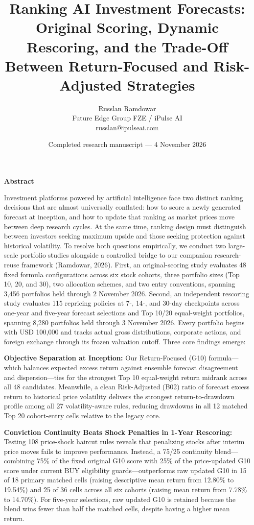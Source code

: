 \documentclass[11pt,a4paper]{article}
\title{Ranking AI Investment Forecasts: Original Scoring, Dynamic Rescoring, and the Trade-Off Between Return-Focused and Risk-Adjusted Strategies}
\author{Russlan Ramdowar\\Future Edge Group FZE / iPulse AI\\\href{mailto:russlan@ipulseai.com}{russlan@ipulseai.com}}
\date{Completed research manuscript --- 4 November 2026}
\numberwithin{table}{section}
\renewenvironment{abstract}{\small\noindent\textbf{Abstract}\par\medskip}{\par}
\begin{document}
\maketitle
\vspace{-1.1em}
\begin{abstract}

Investment platforms powered by artificial intelligence face two distinct ranking decisions that are almost universally conflated: how to score a newly generated forecast at inception, and how to update that ranking as market prices move between deep research cycles. At the same time, ranking design must distinguish between investors seeking maximum upside and those seeking protection against historical volatility. To resolve both questions empirically, we conduct two large-scale portfolio studies alongside a controlled bridge to our companion research-reuse framework (Ramdowar, 2026). First, an original-scoring study evaluates 48 fixed formula configurations across six stock cohorts, three portfolio sizes (Top 10, 20, and 30), two allocation schemes, and two entry conventions, spanning 3,456 portfolios held through 2 November 2026. Second, an independent rescoring study evaluates 115 repricing policies at 7-, 14-, and 30-day checkpoints across one-year and five-year forecast selections and Top 10/20 equal-weight portfolios, spanning 8,280 portfolios held through 3 November 2026. Every portfolio begins with USD 100,000 and tracks actual gross distributions, corporate actions, and foreign exchange through its frozen valuation cutoff. Three core findings emerge:

\textbf{Objective Separation at Inception:}  Our Return-Focused (G10) formula---which balances expected excess return against ensemble forecast disagreement and dispersion---ties for the strongest Top 10 equal-weight return midrank across all 48 candidates. Meanwhile, a clean Risk-Adjusted (B02) ratio of forecast excess return to historical price volatility delivers the strongest return-to-drawdown profile among all 27 volatility-aware rules, reducing drawdowns in all 12 matched Top 20 cohort-entry cells relative to the legacy core.

\textbf{Conviction Continuity Beats Shock Penalties in 1-Year Rescoring:}  Testing 108 price-shock haircut rules reveals that penalizing stocks after interim price moves fails to improve performance. Instead, a 75/25 continuity blend---combining 75\% of the fixed original G10 score with 25\% of the price-updated G10 score under current BUY eligibility guards---outperforms raw updated G10 in 15 of 18 primary matched cells (raising descriptive mean return from 12.80\% to 19.54\%) and 25 of 36 cells across all six cohorts (raising mean return from 7.78\% to 14.70\%). For five-year selections, raw updated G10 is retained because the blend wins fewer than half the matched cells, despite having a higher mean return.


\end{abstract}
\end{document}
